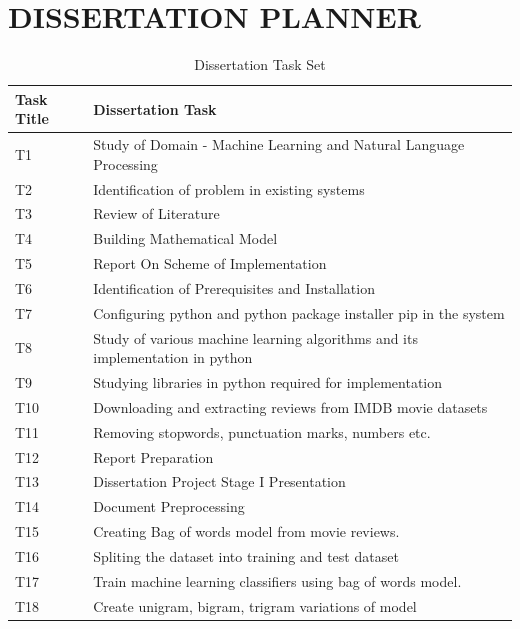 \documentclass[oneside,a4paper,12pt]{pictreport}
\begin{document}
\chapter{DISSERTATION PLANNER}
\renewcommand{\arraystretch}{1.5}
\begin{table}[]
\centering
\caption{Dissertation Task Set}
\label{my-label}
\begin{tabular}{|l|l|}
\hline
\textbf{Task Title} & \textbf{Dissertation Task}                    \\ \hline
T1                  & Study of Domain - Machine Learning and Natural Language Processing         \\ \hline
T2                  & Identification of problem in existing systems \\ \hline
T3                  & Review of Literature \\ 
\hline
T4                  & Building Mathematical Model \\ 
\hline
T5                  & Report On Scheme of Implementation \\ \hline
T6                  & Identification of Prerequisites and Installation \\ \hline
T7                  & Configuring python and python package installer pip in the system \\ \hline
T8                  & Study of various machine learning algorithms and its implementation in python\\ \hline
T9                  & Studying libraries in python required for implementation \\ \hline
T10                  & Downloading and extracting reviews from IMDB movie datasets \\ \hline
T11                  & Removing stopwords, punctuation marks, numbers etc.\\ \hline
T12                  & Report Preparation \\ \hline
T13                  & Dissertation Project Stage I Presentation \\ \hline
T14                  & Document Preprocessing
 \\ \hline
T15                  & Creating Bag of words model from movie reviews.
 \\ \hline
T16                  & Spliting the dataset into training and test dataset \\ \hline
T17                  & Train machine learning classifiers using bag of words model.\\ \hline
T18                  & Create unigram, bigram, trigram variations of model \\ \hline

\end{tabular}
\end{table}
\end{document}
